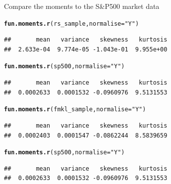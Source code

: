 \documentclass[12pt, a4paper, oneside]{article}\usepackage[]{graphicx}\usepackage[]{color}
\makeatletter
\newcommand{\hlstr}[1]{\textcolor[rgb]{0.192,0.494,0.8}{#1}}%
\newcommand{\hlstd}[1]{\textcolor[rgb]{0.345,0.345,0.345}{#1}}%
\newcommand{\hlkwc}[1]{\textcolor[rgb]{0.333,0.667,0.333}{#1}}%
\newcommand{\hlkwd}[1]{\textcolor[rgb]{0.737,0.353,0.396}{\textbf{#1}}}%
\newenvironment{kframe}{%
 \def\at@end@of@kframe{}%
 \ifinner\ifhmode%
  \def\at@end@of@kframe{\end{minipage}}%
  \begin{minipage}{\columnwidth}%
 \fi\fi%
 \def\FrameCommand##1{\hskip\@totalleftmargin \hskip-\fboxsep
 \colorbox{shadecolor}{##1}\hskip-\fboxsep
     \hskip-\linewidth \hskip-\@totalleftmargin \hskip\columnwidth}%
 \MakeFramed {\advance\hsize-\width
   \@totalleftmargin\z@ \linewidth\hsize
   \@setminipage}}%
 {\par\unskip\endMakeFramed%
 \at@end@of@kframe}
\newenvironment{knitrout}{}{} %
\makeatother
\begin{document}
Compare the moments to the S\&P500 market data
\begin{knitrout}
\color{fgcolor}\begin{kframe}
\begin{alltt}
\hlkwd{fun.moments.r}\hlstd{(rs_sample,} \hlkwc{normalise} \hlstd{=} \hlstr{"Y"}\hlstd{)}
\end{alltt}
\begin{verbatim}
##       mean   variance   skewness   kurtosis 
##  2.633e-04  9.774e-05 -1.043e-01  9.955e+00
\end{verbatim}
\begin{alltt}
\hlkwd{fun.moments.r}\hlstd{(sp500,} \hlkwc{normalise} \hlstd{=} \hlstr{"Y"}\hlstd{)}
\end{alltt}
\begin{verbatim}
##       mean   variance   skewness   kurtosis 
##  0.0002633  0.0001532 -0.0960976  9.5131553
\end{verbatim}
\begin{alltt}
\hlkwd{fun.moments.r}\hlstd{(fmkl_sample,} \hlkwc{normalise} \hlstd{=} \hlstr{"Y"}\hlstd{)}
\end{alltt}
\begin{verbatim}
##       mean   variance   skewness   kurtosis 
##  0.0002403  0.0001547 -0.0862244  8.5839659
\end{verbatim}
\begin{alltt}
\hlkwd{fun.moments.r}\hlstd{(sp500,} \hlkwc{normalise} \hlstd{=} \hlstr{"Y"}\hlstd{)}
\end{alltt}
\begin{verbatim}
##       mean   variance   skewness   kurtosis 
##  0.0002633  0.0001532 -0.0960976  9.5131553
\end{verbatim}
\end{kframe}
\end{knitrout}
\end{document}
